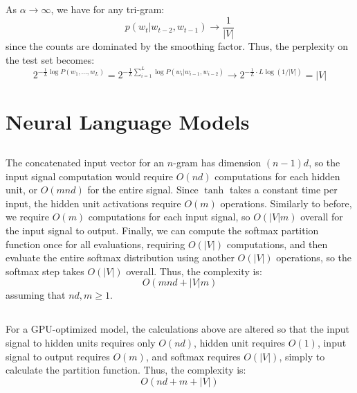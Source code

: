 \documentclass[psamsfonts]{amsart}
\theoremstyle{definition}
\theoremstyle{remark}
\numberwithin{equation}{section}
\begin{document}
\subsection{} As $\alpha \rightarrow \infty$, we have for any tri-gram:
$$p(w_t|w_{t-2},w_{t-1}) \rightarrow \frac{1}{|V|}$$
since the counts are dominated by the smoothing factor. Thus, the perplexity on the test set becomes:
$$2^{-\frac{1}{L}\log P(w_1, \dots, w_L)} = 2^{-\frac{1}{L}\sum_{i=1}^L \log P(w_i|w_{i-1},w_{i-2})} \rightarrow 2^{-\frac{1}{L}\cdot L \log(1/|V|)} = |V|$$

\section{Neural Language Models}

\subsection{} The concatenated input vector for an $n$-gram has dimension $(n-1)d$, so the input signal computation would require $O(nd)$ computations for each hidden unit, or $O(mnd)$ for the entire signal. Since $\tanh$ takes a constant time per input, the hidden unit activations require $O(m)$ operations. Similarly to before, we require $O(m)$ computations for each input signal, so $O(|V|m)$ overall for the input signal to output. Finally, we can compute the softmax partition function once for all evaluations, requiring $O(|V|)$ computations, and then evaluate the entire softmax distribution using another $O(|V|)$ operations, so the softmax step takes $O(|V|)$ overall. Thus, the complexity is:
$$O(mnd + |V|m)$$
assuming that $nd, m \geq 1$.

\subsection{} For a GPU-optimized model, the calculations above are altered so that the input signal to hidden units requires only $O(nd)$, hidden unit requires $O(1)$, input signal to output requires $O(m)$, and softmax requires $O(|V|)$, simply to calculate the partition function. Thus, the complexity is:
$$O(nd + m + |V|)$$
\end{document}
